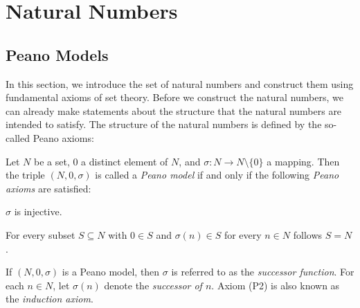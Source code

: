 \section{Natural Numbers}\label{section:natural_numbers}

\subsection{Peano Models}

In this section, we introduce the set of natural numbers and construct them using fundamental axioms of set theory. Before we construct the natural numbers, we can already make statements about the structure that the natural numbers are intended to satisfy. The structure of the natural numbers is defined by the so-called Peano axioms:

\begin{definition}
    Let $N$ be a set, $0$ a distinct element of $N$, and $\sigma\colon N\rightarrow N\setminus\{0\}$ a mapping. Then the triple $(N,0,\sigma)$ is called a \emph{Peano model} if and only if the following \emph{Peano axioms} are satisfied:
    \begin{definitionenumerate}[label=\bfseries(P\arabic*),ref=\thedefinition(P\arabic*)]
        \item\label{definition:natural_numbers:peano_axiom_injective} $\sigma$ is injective.
        \item\label{definition:natural_numbers:peano_axiom_induction} For every subset $S\subseteq N$ with $0\in S$ and $\sigma(n)\in S$ for every $n\in N$ follows $S=N$.
    \end{definitionenumerate}
    If $(N,0,\sigma)$ is a Peano model, then $\sigma$ is referred to as the \emph{successor function}. For each $n\in N$, let $\sigma(n)$ denote the \emph{successor of $n$}. Axiom (P2) is also known as the \emph{induction axiom}.
\end{definition}

